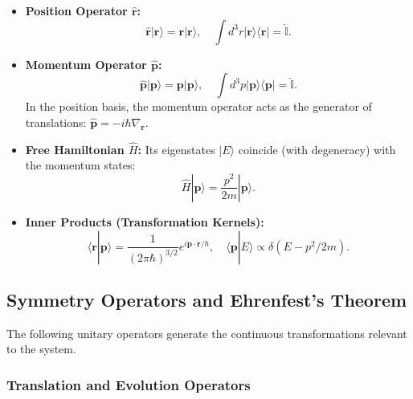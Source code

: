 \begin{itemize}
    \item \textbf{Position Operator $\hat{\mathbf{r}}$:} 
    \begin{equation}
        \hat{\mathbf{r}}|\mathbf{r}\rangle = \mathbf{r}|\mathbf{r}\rangle, \quad \int d^3r |\mathbf{r}\rangle\langle\mathbf{r}| = \hat{\mathbb{I}}.
    \end{equation}
    
    \item \textbf{Momentum Operator $\hat{\mathbf{p}}$:}
    \begin{equation}
        \hat{\mathbf{p}}|\mathbf{p}\rangle = \mathbf{p}|\mathbf{p}\rangle, \quad \int d^3p |\mathbf{p}\rangle\langle\mathbf{p}| = \hat{\mathbb{I}}.
    \end{equation}
    In the position basis, the momentum operator acts as the generator of translations: $\hat{\mathbf{p}} = -i\hbar\nabla_\mathbf{r}$.
    
    \item \textbf{Free Hamiltonian $\hat{H}$:}
    Its eigenstates $|E\rangle$ coincide (with degeneracy) with the momentum states:
    \begin{equation}
        \hat{H}|\mathbf{p}\rangle = \frac{p^2}{2m}|\mathbf{p}\rangle.
    \end{equation}
    
    \item \textbf{Inner Products (Transformation Kernels):}
    \begin{equation}
        \langle \mathbf{r} | \mathbf{p} \rangle = \frac{1}{(2\pi\hbar)^{3/2}}e^{i\mathbf{p}\cdot\mathbf{r}/\hbar}, \quad \langle \mathbf{p} | E \rangle \propto \delta(E - p^2/2m).
    \end{equation}
\end{itemize}

\subsection{Symmetry Operators and Ehrenfest's Theorem}

The following unitary operators generate the continuous transformations relevant to the system.

\subsubsection{Translation and Evolution Operators}

